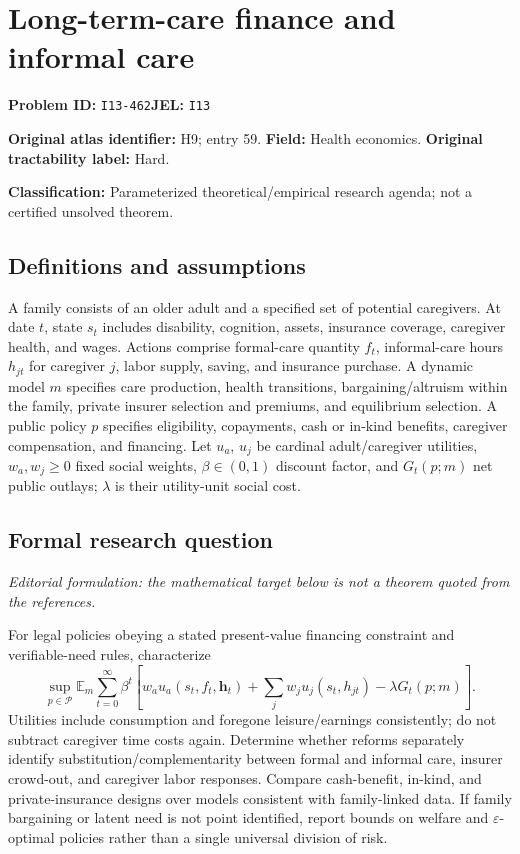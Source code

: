 \documentclass[11pt,a4paper]{article}
\begin{document}
\section*{Long-term-care finance and informal care}
\textbf{Problem ID:} \texttt{I13-462}\quad \textbf{JEL:} \texttt{I13}\par
\label{problem:OP-0059}
\label{atlas:prob:H9}
\noindent\textbf{Original atlas identifier:} H9; entry 59. \textbf{Field:} Health economics. \textbf{Original tractability label:} Hard.

\noindent\textbf{Classification:} Parameterized theoretical/empirical research agenda; not a certified unsolved theorem.

\subsection*{Definitions and assumptions}
A family consists of an older adult and a specified set of potential caregivers. At date $t$, state $s_t$ includes disability, cognition, assets, insurance coverage, caregiver health, and wages. Actions comprise formal-care quantity $f_t$, informal-care hours $h_{jt}$ for caregiver $j$, labor supply, saving, and insurance purchase. A dynamic model $m$ specifies care production, health transitions, bargaining/altruism within the family, private insurer selection and premiums, and equilibrium selection. A public policy $p$ specifies eligibility, copayments, cash or in-kind benefits, caregiver compensation, and financing. Let $u_a$, $u_j$ be cardinal adult/caregiver utilities, $w_a,w_j\geq0$ fixed social weights, $\beta\in(0,1)$ discount factor, and $G_t(p;m)$ net public outlays; $\lambda$ is their utility-unit social cost.

\subsection*{Formal research question}
\emph{Editorial formulation: the mathematical target below is not a theorem quoted from the references.}

For legal policies obeying a stated present-value financing constraint and verifiable-need rules, characterize
\[
 \sup_{p\in\mathcal P}\mathbb E_m\sum_{t=0}^{\infty}\beta^t
 \left[w_a u_a(s_t,f_t,\mathbf h_t)+\sum_jw_j u_j(s_t,h_{jt})-\lambda G_t(p;m)\right].
\]
Utilities include consumption and foregone leisure/earnings consistently; do not subtract caregiver time costs again. Determine whether reforms separately identify substitution/complementarity between formal and informal care, insurer crowd-out, and caregiver labor responses. Compare cash-benefit, in-kind, and private-insurance designs over models consistent with family-linked data. If family bargaining or latent need is not point identified, report bounds on welfare and $\varepsilon$-optimal policies rather than a single universal division of risk.
\end{document}
